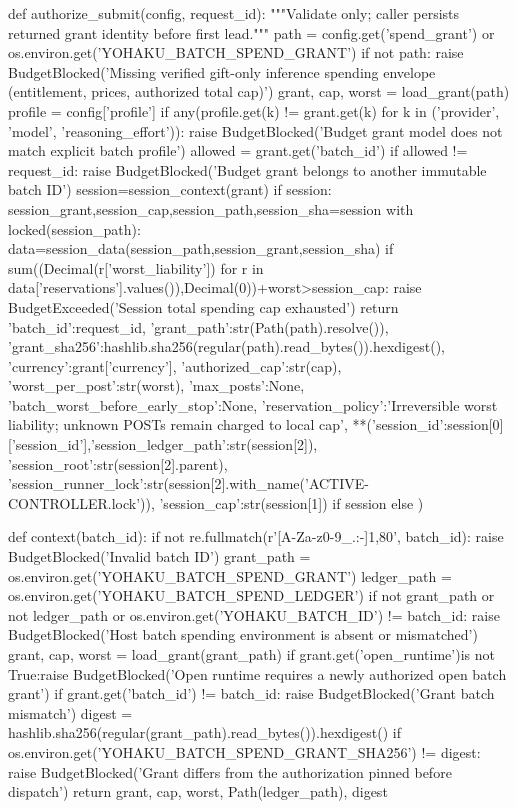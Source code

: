 def authorize_submit(config, request_id):
    """Validate only; caller persists returned grant identity before first lead."""
    path = config.get('spend_grant') or os.environ.get('YOHAKU_BATCH_SPEND_GRANT')
    if not path: raise BudgetBlocked('Missing verified gift-only inference spending envelope (entitlement, prices, authorized total cap)')
    grant, cap, worst = load_grant(path)
    profile = config['profile']
    if any(profile.get(k) != grant.get(k) for k in ('provider', 'model', 'reasoning_effort')):
        raise BudgetBlocked('Budget grant model does not match explicit batch profile')
    allowed = grant.get('batch_id')
    if allowed != request_id: raise BudgetBlocked('Budget grant belongs to another immutable batch ID')
    session=session_context(grant)
    if session:
        session_grant,session_cap,session_path,session_sha=session
        with locked(session_path):
            data=session_data(session_path,session_grant,session_sha)
            if sum((Decimal(r['worst_liability']) for r in data['reservations'].values()),Decimal(0))+worst>session_cap:
                raise BudgetExceeded('Session total spending cap exhausted')
    return {'batch_id':request_id, 'grant_path':str(Path(path).resolve()),
            'grant_sha256':hashlib.sha256(regular(path).read_bytes()).hexdigest(),
            'currency':grant['currency'], 'authorized_cap':str(cap), 'worst_per_post':str(worst),
            'max_posts':None,
            'batch_worst_before_early_stop':None,
            'reservation_policy':'Irreversible worst liability; unknown POSTs remain charged to local cap',
            **({'session_id':session[0]['session_id'],'session_ledger_path':str(session[2]),
                'session_root':str(session[2].parent),
                'session_runner_lock':str(session[2].with_name('ACTIVE-CONTROLLER.lock')),
                'session_cap':str(session[1])} if session else {})}

def context(batch_id):
    if not re.fullmatch(r'[A-Za-z0-9_.:-]{1,80}', batch_id): raise BudgetBlocked('Invalid batch ID')
    grant_path = os.environ.get('YOHAKU_BATCH_SPEND_GRANT')
    ledger_path = os.environ.get('YOHAKU_BATCH_SPEND_LEDGER')
    if not grant_path or not ledger_path or os.environ.get('YOHAKU_BATCH_ID') != batch_id:
        raise BudgetBlocked('Host batch spending environment is absent or mismatched')
    grant, cap, worst = load_grant(grant_path)
    if grant.get('open_runtime')is not True:raise BudgetBlocked('Open runtime requires a newly authorized open batch grant')
    if grant.get('batch_id') != batch_id: raise BudgetBlocked('Grant batch mismatch')
    digest = hashlib.sha256(regular(grant_path).read_bytes()).hexdigest()
    if os.environ.get('YOHAKU_BATCH_SPEND_GRANT_SHA256') != digest:
        raise BudgetBlocked('Grant differs from the authorization pinned before dispatch')
    return grant, cap, worst, Path(ledger_path), digest

